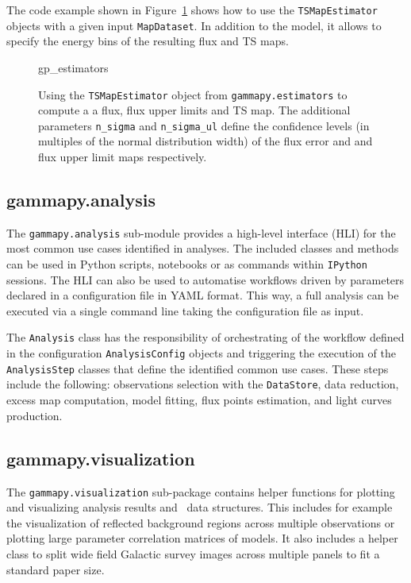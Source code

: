 \documentclass[traditabstract, longauth]{aa}
\newcommand{\code}[1]{\texttt{#1}}
\begin{document}
The code example shown in Figure~\ref{fig*:minted:gp_estimators} shows how to use
the \code{TSMapEstimator} objects with a given input \code{MapDataset}.
In addition to the model, it allows to specify the energy
bins of the resulting flux and TS maps.


\begin{figure}
	\small
	{gp_estimators}
	\caption{Using the \code{TSMapEstimator} object from \code{gammapy.estimators} to compute a
        a flux, flux upper limits and TS map. The additional parameters \code{n\_sigma}
        and \code{n\_sigma\_ul} define the confidence levels (in multiples of the normal distribution width)
        of the flux error and and flux upper limit maps respectively.
    }
    \label{fig*:minted:gp_estimators}
\end{figure}

\subsection{gammapy.analysis}
\label{ssec:gammapy-analysis}
The \code{gammapy.analysis} sub-module provides a high-level interface (HLI) for the most
common use cases identified in \gammaray analyses. The included classes and methods
 can be used in Python scripts, notebooks or as commands within \texttt{IPython}
sessions. The HLI can also be used to automatise
workflows driven by parameters declared in a configuration file in YAML format.
This way, a full analysis can be executed via a single command line taking the
configuration file as input.

The \code{Analysis} class has the responsibility of orchestrating of the workflow
defined in the configuration \code{AnalysisConfig} objects and triggering the execution of
the \code{AnalysisStep} classes that define the identified common use cases. These
steps include the following: observations selection with the \code{DataStore},  data
reduction, excess map computation, model fitting, flux points estimation, and
light curves production.


\subsection{gammapy.visualization}
\label{ssec:gammapy-visualization}
The \code{gammapy.visualization} sub-package contains helper functions
for plotting and visualizing analysis results and \gammapy~data structures.
This includes for example the visualization of reflected background regions across
multiple observations or plotting large parameter correlation matrices of
\gammapy models. It also includes a helper class to split
wide field Galactic survey images across multiple panels to fit a standard
paper size.
\end{document}
